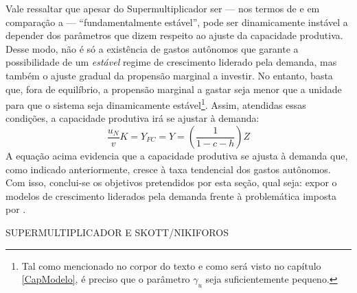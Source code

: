Vale ressaltar que apesar do Supermultiplicador ser --- nos termos de \textcite{hicks_capital_1965} e em comparação a \textcite{harrod_essay_1939} --- ``fundamentalmente estável'', pode ser dinamicamente instável a depender dos parâmetros que dizem respeito ao ajuste da capacidade produtiva. Desse modo, não é só a existência de gastos autônomos que garante a possibilidade de um \textit{estável} regime de crescimento liderado pela demanda, mas também o ajuste gradual da propensão marginal a investir. No entanto, basta que, fora de equilíbrio, a propensão marginal a gastar seja menor que a unidade para que o sistema seja dinamicamente estável\footnote{Tal como mencionado no corpor do texto e como será visto no capítulo \ref{CapModelo}, é preciso que o parâmetro $\gamma_u$ seja suficientemente pequeno.}. Assim, atendidas essas condições, a capacidade produtiva irá se ajustar à demanda:
$$
 \frac{u_N}{v}K = Y_{FC} = Y = \left(\frac{1}{1 - c - h}\right)Z
$$
A equação acima evidencia que a capacidade produtiva se ajusta à demanda que, como indicado anteriormente, cresce à taxa tendencial dos gastos autônomos. Com isso, conclui-se os objetivos pretendidos por esta seção, qual seja: expor o modelos de crescimento liderados pela demanda frente à problemática imposta por \textcite{harrod_essay_1939}. 



SUPERMULTIPLICADOR E SKOTT/NIKIFOROS

\begin{comment}
Antes de prosseguir para a discussão sobre a convergência do grau de utilização, é necessário pontuar uma qualificação quanto o papel das expectativas no supermultiplicador. \textcite[p.~87]{serrano_long_1995} reconhece que o grau de utilização pode não convergir ao normal, mas tal resultado decorre de formulações \textbf{persistentemente} erradas sobre a evolução da demanda efetiva. Em resposta à esse argumento, \textcites{allain_macroeconomic_2014}{palley_economics_2018} afirmam que a instabilidade harrodiana é eliminada no Supermultiplicador por hipótese.

Vale notar que a exposição anterior permitiu apresentar a resolução desse problema sem recorrer à suposições sobre a formulação das expectativas. Desse modo, dizer que o Supermultiplicador Sraffiano resolve a instabilidade Harrodiana por meio de hipóteses expectacionais não contempla de forma adequada o papel desempenhado pelo investimento induzido e dão muita ênfase à existência de gastos autônomos. Uma implicação dessa incompreensão é o esforço da literatura Kaleckiana em garantir os resultados do modelo canônico na presença de gastos autônomos sem abandonar a ideia de que o investimento produtivo é autônomo no longo prazo. Tal discussão é endereçada parcialmente na seção seguinte.
\end{comment}